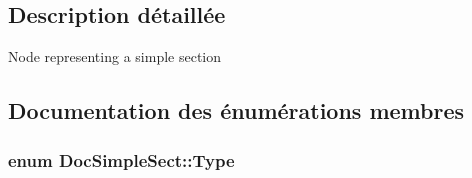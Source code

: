 \subsection{Description détaillée}
Node representing a simple section 

\subsection{Documentation des énumérations membres}
\hypertarget{class_doc_simple_sect_a3b9f9dd4952f3d819b347f74a6769a9b}{}
\subsubsection[{Type}]{\setlength{\rightskip}{0pt plus 5cm}enum {\bf Doc\+Simple\+Sect\+::\+Type}}\label{class_doc_simple_sect_a3b9f9dd4952f3d819b347f74a6769a9b}
